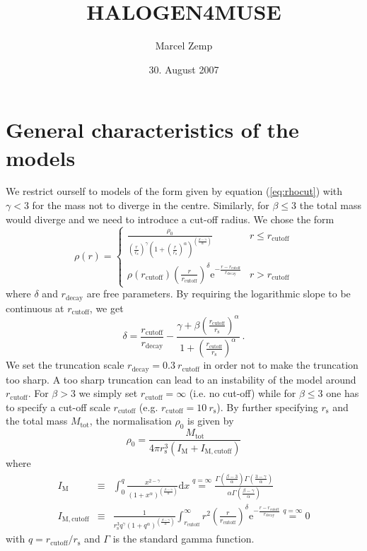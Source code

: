 \documentclass[a4paper,10pt]{article}
\author{Marcel Zemp}
\title{HALOGEN4MUSE}
\date{30. August 2007}
\newcommand{\rs}{r_{\mathrm{s}}}
\newcommand{\rcut}{r_{\mathrm{cutoff}}}
\newcommand{\rdec}{r_{\mathrm{decay}}}
\newcommand{\Mtot}{M_{\mathrm{tot}}}
\begin{document}
\maketitle


\section{General characteristics of the models}

We restrict ourself to models of the form given by equation (\ref{eq:rhocut}) with $\gamma < 3$ for the mass not to diverge in the centre. Similarly, for $\beta \leq 3$ the total mass would diverge and we need to introduce a cut-off radius. We chose the form
\begin{equation} \label{eq:rhocut}
\rho(r) = \left\{
\begin{array}{ll}
\frac{\rho_0}{\left(\frac{r}{\rs}\right)^\gamma \left(1+\left(\frac{r}{\rs}\right)^\alpha
\right)^{\left(\frac{\beta-\gamma}{\alpha}\right)}}	&
r \leq \rcut \\
\rho(\rcut) \left(\frac{r}{\rcut}\right)^\delta \mathrm{e}^{-\frac{r-\rcut}{\rdec}} &
r > \rcut
\end{array}
\right.
\end{equation}
where $\delta$ and $\rdec$ are free parameters. By requiring the logarithmic slope to be continuous at $\rcut$, we get
\begin{equation}
\delta = \frac{\rcut}{\rdec} - \frac{\gamma + 
\beta \left(\frac{\rcut}{\rs}\right)^{\alpha}}{1 + \left(\frac{\rcut}{\rs}\right)^{\alpha}}~.
\end{equation}
We set the truncation scale $\rdec = 0.3~\rcut$ in order not to make the truncation too sharp. A too sharp truncation can lead to an instability of the model around $\rcut$. For $\beta > 3$ we simply set $\rcut = \infty$ (i.e. no cut-off) while for $\beta \leq 3$ one has to specify a cut-off scale $\rcut$ (e.g. $\rcut = 10~\rs$). By further specifying $\rs$ and the total mass $\Mtot$, the normalisation $\rho_{0}$ is given by
\begin{equation}
\rho_0 = \frac{\Mtot}{4 \pi \rs^3 (I_{\mathrm{M}} + I_{\mathrm{M,cutoff}})}
\end{equation}
where
\begin{eqnarray}
I_{\mathrm{M}} &\equiv& \int_0^{q} \frac{x^{2-\gamma}}{\left(1+x^\alpha\right)^{\left(\frac{\beta-\gamma}{\alpha}\right)}} \mathrm{d}x
\stackrel{q=\infty}{=} \frac{\Gamma\left(\frac{\beta-3}{\alpha}\right) \Gamma\left(\frac{3-\gamma}{\alpha}\right)}{\alpha \Gamma\left(\frac{\beta-\gamma}{\alpha}\right)} \\
I_{\mathrm{M,cutoff}} &\equiv&
\frac{1}
{\rs^3 q^\gamma \left(1+q^\alpha\right)^{\left(\frac{\beta-\gamma}{\alpha}\right)}}
\int_{\rcut}^{\infty} r^2 \left(\frac{r}{\rcut}\right)^{\delta} \mathrm{e}^{-\frac{r-\rcut}{\rdec}} \stackrel{q=\infty}{=} 0
\end{eqnarray}
with $q = \rcut / \rs$ and $\Gamma$ is the standard gamma function.
\end{document}
